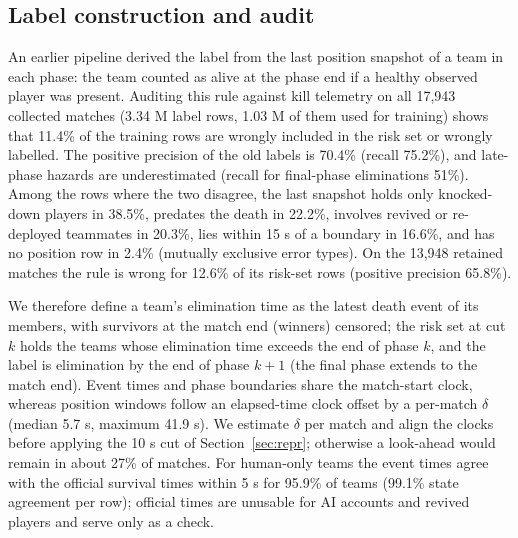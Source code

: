 \subsection{Label construction and audit}\label{sec:labels}
An earlier pipeline derived the label from the last position snapshot of a team in each phase: the team counted as alive at the phase end if a healthy observed player was present. Auditing this rule against kill telemetry on all 17,943 collected matches (3.34 M label rows, 1.03 M of them used for training) shows that 11.4\% of the training rows are wrongly included in the risk set or wrongly labelled. The positive precision of the old labels is 70.4\% (recall 75.2\%), and late-phase hazards are underestimated (recall for final-phase eliminations 51\%). Among the rows where the two disagree, the last snapshot holds only knocked-down players in 38.5\%, predates the death in 22.2\%, involves revived or re-deployed teammates in 20.3\%, lies within 15 s of a boundary in 16.6\%, and has no position row in 2.4\% (mutually exclusive error types). On the 13,948 retained matches the rule is wrong for 12.6\% of its risk-set rows (positive precision 65.8\%).

We therefore define a team's elimination time as the latest death event of its members, with survivors at the match end (winners) censored; the risk set at cut $k$ holds the teams whose elimination time exceeds the end of phase $k$, and the label is elimination by the end of phase $k{+}1$ (the final phase extends to the match end). Event times and phase boundaries share the match-start clock, whereas position windows follow an elapsed-time clock offset by a per-match $\delta$ (median 5.7 s, maximum 41.9 s). We estimate $\delta$ per match and align the clocks before applying the 10 s cut of Section~\ref{sec:repr}; otherwise a look-ahead would remain in about 27\% of matches. For human-only teams the event times agree with the official survival times within 5 s for 95.9\% of teams (99.1\% state agreement per row); official times are unusable for AI accounts and revived players and serve only as a check.

